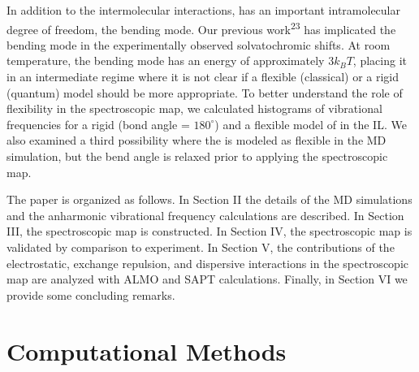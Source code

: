 \documentclass[]{article}
\begin{document}
In addition to the intermolecular interactions,  has an important intramolecular degree of freedom, the bending mode. Our previous work\textsuperscript{23} has implicated the bending mode in the experimentally observed solvatochromic shifts. At room temperature, the bending mode has an energy of approximately \(3k_{B}T\), placing it in an intermediate regime where it is not clear if a flexible (classical) or a rigid (quantum) model should be more appropriate. To better understand the role of  flexibility in the spectroscopic map, we calculated histograms of vibrational frequencies for a rigid (bond angle = \(180^{\circ}\)) and a flexible model of  in the \ce{[C4C1im][PF6]} IL. We also examined a third possibility where the  is modeled as flexible in the MD simulation, but the bend angle is relaxed prior to applying the spectroscopic map.

The paper is organized as follows. In Section II the details of the MD simulations and the anharmonic vibrational frequency calculations are described. In Section III, the spectroscopic map is constructed. In Section IV, the spectroscopic map is validated by comparison to experiment. In Section V, the contributions of the electrostatic, exchange repulsion, and dispersive interactions in the spectroscopic map are analyzed with ALMO and SAPT calculations. Finally, in Section VI we provide some concluding remarks.

\section{Computational Methods}
\label{paper_03:sec:II}
\end{document}
